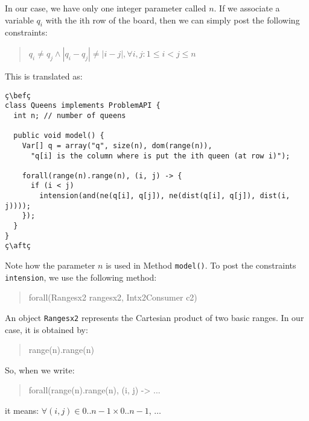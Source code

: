\documentclass[10pt]{article}
\newcommand{\gb}[1]{{\tt #1}} %
\newcommand{\nn}[1]{{\tt #1}} %
\newenvironment{myvb}{\endgraf\small\verbatim}{\endverbatim}
\def\bef{\rule{10cm}{0.1mm}} %
\def\aft{\rule{10cm}{0.1mm}\medskip}
\begin{document}
In our case, we have only one integer parameter called $n$.
If we associate a variable $q_i$ with the ith row of the board, then we can simply post the following constraints:
\begin{quote}
  $q_i \neq q_j \land |q_i - q_j| \neq |i - j|, \forall i, j : 1 \leq i < j \leq n$
\end{quote}
This is translated as:

\begin{lstlisting}
ç\befç
class Queens implements ProblemAPI {
  int n; // number of queens

  public void model() {
    Var[] q = array("q", size(n), dom(range(n)),
      "q[i] is the column where is put the ith queen (at row i)");
    
    forall(range(n).range(n), (i, j) -> {
      if (i < j)
        intension(and(ne(q[i], q[j]), ne(dist(q[i], q[j]), dist(i, j))));
    });
  }
}
ç\aftç
\end{lstlisting}

Note how the parameter $n$ is used in Method \nn{model()}.
To post the constraints \gb{intension}, we use the following method:

\begin{quote}
\begin{myvb}
forall(Rangesx2 rangesx2, Intx2Consumer c2) 
\end{myvb}
\end{quote}

An object \nn{Rangesx2} represents the Cartesian product of two basic ranges. In our case, it is obtained by:
\begin{quote}
\begin{myvb}
range(n).range(n)
\end{myvb}
\end{quote}
So, when we write:
\begin{quote}
\begin{myvb}
forall(range(n).range(n), (i, j) -> ...
\end{myvb}
\end{quote}
it means: $\forall (i,j) \in 0..n-1 \times 0..n-1$, $\dots$
\end{document}
